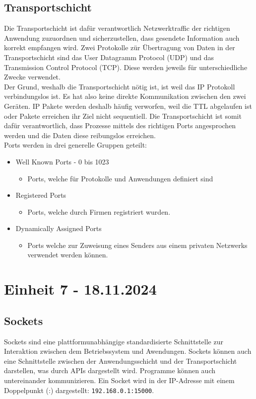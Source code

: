 \documentclass{article}
\begin{document}
	 \subsection{Transportschicht}
	 Die Transportschicht ist dafür verantwortlich Netzwerktraffic der richtigen Anwendung zuzuordnen und sicherzustellen, dass gesendete Information auch korrekt empfangen wird. Zwei Protokolle zür Übertragung von Daten in der Transportschicht sind das User Datagramm Protocol (UDP) und das Transmission Control Protocol (TCP). Diese werden jeweils für unterschiedliche Zwecke verwendet.\\
	 Der Grund, weshalb die Transportschicht nötig ist, ist weil das IP Protokoll verbindungslos ist. Es hat also keine direkte Kommunikation zwischen den zwei Geräten. IP Pakete werden deshalb häufig verworfen, weil die TTL abgelaufen ist oder Pakete erreichen ihr Ziel nicht sequentiell. Die Transportschicht ist somit dafür verantwortlich, dass Prozesse mittels des richtigen Ports angesprochen werden und die Daten diese reibungslos erreichen. \\
	 Ports werden in drei generelle Gruppen geteilt:
	 \begin{itemize}
	 	\item{Well Known Ports - 0 bis 1023}
	 	\begin{itemize}
	 		\item{Ports, welche für Protokolle und Anwendungen definiert sind}
	 	\end{itemize}
	 	\item{Registered Ports}
	 	\begin{itemize}
	 		\item{Ports, welche durch Firmen registriert wurden.}
	 	\end{itemize}
	 	\item{Dynamically Assigned Ports}
	 	\begin{itemize}
	 		\item{Ports welche zur Zuweisung eines Senders aus einem privaten Netzwerks verwendet werden können.}
	 	\end{itemize}
	 \end{itemize}
	 \section{Einheit 7 - 18.11.2024}
	 \subsection{Sockets}
	 Sockets sind eine plattformunabhängige standardisierte Schnittstelle zur Interaktion zwischen dem Betriebssystem und Awendungen. Sockets können auch eine Schnittstelle zwischen der Anwendungsschicht und der Transportschicht darstellen, was durch APIs dargestellt wird. Programme können auch untereinander kommunizieren. Ein Socket wird in der IP-Adresse mit einem Doppelpunkt (:) dargestellt: \verb|192.168.0.1:15000|.
\end{document}
